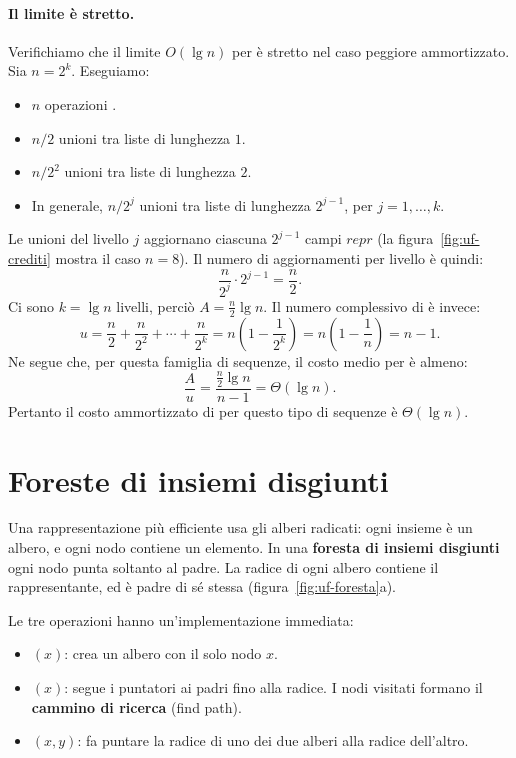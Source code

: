 \paragraph{Il limite è stretto.}
Verifichiamo che il limite $O(\lg n)$ per \Union{} è stretto nel caso peggiore ammortizzato. Sia $n = 2^k$. Eseguiamo:
\begin{itemize}
    \item $n$ operazioni \MakeSet{}.
    \item $n/2$ unioni tra liste di lunghezza $1$.
    \item $n/2^2$ unioni tra liste di lunghezza $2$.
    \item In generale, $n/2^j$ unioni tra liste di lunghezza $2^{j-1}$, per $j = 1, \ldots, k$.
\end{itemize}

Le unioni del livello $j$ aggiornano ciascuna $2^{j-1}$ campi $\mathit{repr}$ (la figura~\ref{fig:uf-crediti} mostra il caso $n = 8$). Il numero di aggiornamenti per livello è quindi:
\[
\frac{n}{2^j} \cdot 2^{j-1} = \frac{n}{2}.
\]
Ci sono $k = \lg n$ livelli, perciò $A = \frac{n}{2} \lg n$. Il numero complessivo di \Union{} è invece:
\[
u = \frac{n}{2} + \frac{n}{2^2} + \cdots + \frac{n}{2^k} = n\left(1 - \frac{1}{2^k}\right) = n\left(1 - \frac{1}{n}\right) = n - 1.
\]
Ne segue che, per questa famiglia di sequenze, il costo medio per \Union{} è almeno:
\[
\frac{A}{u} = \frac{\frac{n}{2} \lg n}{n - 1} = \Theta(\lg n).
\]
Pertanto il costo ammortizzato di \Union{} per questo tipo di sequenze è $\Theta(\lg n)$.

\section{Foreste di insiemi disgiunti}\label{sec:uf-foreste}
Una rappresentazione più efficiente usa gli alberi radicati: ogni insieme è un albero, e ogni nodo contiene un elemento. In una \textbf{foresta di insiemi disgiunti} ogni nodo punta soltanto al padre. La radice di ogni albero contiene il rappresentante, ed è padre di sé stessa (figura~\ref{fig:uf-foresta}a).

Le tre operazioni hanno un'implementazione immediata:
\begin{itemize}
    \item \MakeSet$(x)$: crea un albero con il solo nodo $x$.
    \item \FindSet$(x)$: segue i puntatori ai padri fino alla radice. I nodi visitati formano il \textbf{cammino di ricerca} (find path).
    \item \Union$(x,y)$: fa puntare la radice di uno dei due alberi alla radice dell'altro.
\end{itemize}

